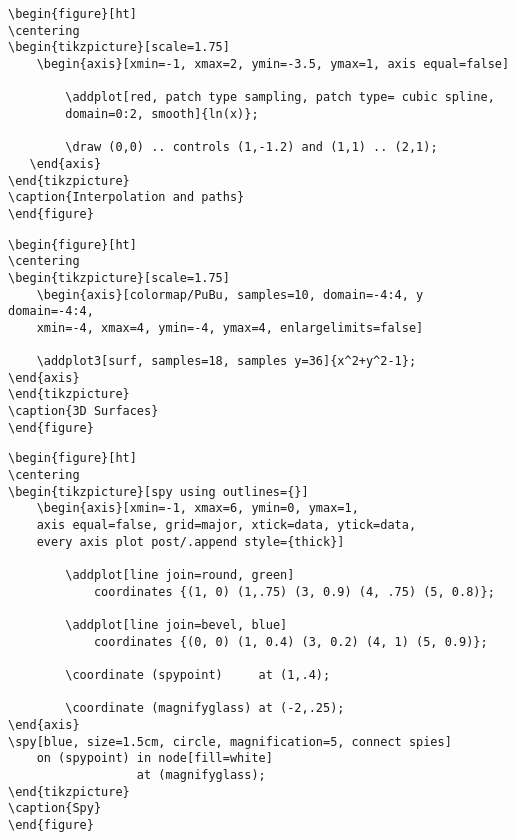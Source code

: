\newpage
\begin{verbatim}
\begin{figure}[ht]
\centering
\begin{tikzpicture}[scale=1.75]
    \begin{axis}[xmin=-1, xmax=2, ymin=-3.5, ymax=1, axis equal=false]

        \addplot[red, patch type sampling, patch type= cubic spline,
        domain=0:2, smooth]{ln(x)};
        
        \draw (0,0) .. controls (1,-1.2) and (1,1) .. (2,1);
   \end{axis}
\end{tikzpicture}
\caption{Interpolation and paths}
\end{figure}
\end{verbatim}

\newpage
\begin{verbatim}
\begin{figure}[ht]
\centering
\begin{tikzpicture}[scale=1.75]
    \begin{axis}[colormap/PuBu, samples=10, domain=-4:4, y domain=-4:4,
    xmin=-4, xmax=4, ymin=-4, ymax=4, enlargelimits=false]
    
    \addplot3[surf, samples=18, samples y=36]{x^2+y^2-1};
\end{axis}
\end{tikzpicture}	
\caption{3D Surfaces}
\end{figure}
\end{verbatim}

\newpage
\begin{verbatim}
\begin{figure}[ht]
\centering
\begin{tikzpicture}[spy using outlines={}]
    \begin{axis}[xmin=-1, xmax=6, ymin=0, ymax=1,
    axis equal=false, grid=major, xtick=data, ytick=data,
    every axis plot post/.append style={thick}]

        \addplot[line join=round, green]
            coordinates {(1, 0) (1,.75) (3, 0.9) (4, .75) (5, 0.8)};
            
        \addplot[line join=bevel, blue]
            coordinates {(0, 0) (1, 0.4) (3, 0.2) (4, 1) (5, 0.9)};

        \coordinate (spypoint)     at (1,.4);
        
        \coordinate (magnifyglass) at (-2,.25);
\end{axis}
\spy[blue, size=1.5cm, circle, magnification=5, connect spies]
    on (spypoint) in node[fill=white]
                  at (magnifyglass);
\end{tikzpicture}	
\caption{Spy}
\end{figure}
\end{verbatim}

